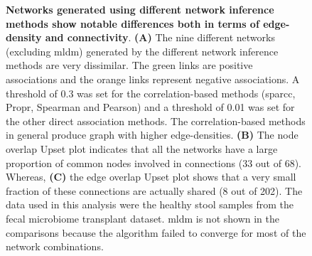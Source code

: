   \FloatBarrier
  \newpage
  \begin{figure}[H]
    \centering
    \caption{
      \textbf{Networks generated using different network inference methods show notable differences both in terms of edge-density and connectivity}.
      \textbf{(A)} The nine different networks (excluding \ac{mldm}) generated by the different network inference methods are very dissimilar.
      The green links are positive associations and the orange links represent negative associations.
      A threshold of 0.3 was set for the correlation-based methods (\ac{sparcc}, Propr, Spearman and Pearson) and a threshold of 0.01 was set for the other direct association methods.
      The correlation-based methods in general produce graph with higher edge-densities.
      \textbf{(B)} The node overlap Upset plot indicates that all the networks have a large proportion of common nodes involved in connections (33 out of 68).
      Whereas, \textbf{(C)} the edge overlap Upset plot shows that a very small fraction of these connections are actually shared (8 out of 202).
      The data used in this analysis were the healthy stool samples from the fecal microbiome transplant dataset.
      \ac{mldm} is not shown in the comparisons because the algorithm failed to converge for most of the network combinations.
    }
    \label{fig:figure4}
  \end{figure}


